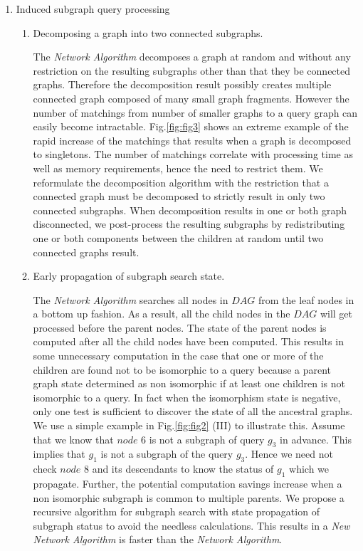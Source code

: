 \begin{enumerate}
\item Induced subgraph query processing

\begin{enumerate}
\item Decomposing a graph into two connected subgraphs.


The \textit{Network Algorithm} decomposes a graph at random and without any restriction on the resulting subgraphs other than that they be connected graphs.
Therefore the decomposition result possibly creates multiple connected graph composed of many small graph fragments.
However the number of matchings from number of smaller graphs to a query graph can easily become intractable.
Fig.\ref{fig:fig3} shows an extreme example of the rapid increase of the matchings that results when a graph is decomposed to singletons.
The number of matchings correlate with processing time as well as memory requirements, hence the need to restrict them. We reformulate the decomposition algorithm with the restriction that a connected graph must be decomposed to strictly result in only two connected subgraphs. When decomposition results in one or both graph disconnected, we post-process the resulting subgraphs by redistributing one or both components between the children  at random until two connected graphs result.


\item Early propagation of subgraph search state.

The \textit{Network Algorithm} searches all nodes in $DAG$ from the leaf nodes in a bottom up fashion.
As a result, all the child nodes in the $DAG$ will get processed before the parent nodes. The state of the parent nodes is computed after all the child nodes have been computed. This results in some unnecessary computation in the case that one or more of the children are found not to be isomorphic to a query because a parent graph state determined as non isomorphic if at least one children is not isomorphic to a query.  In fact when the isomorphism state is negative, only one test is sufficient to discover the state of all the ancestral graphs. We use a simple example in Fig.\ref{fig:fig2} (III) to illustrate this.
Assume that we know that $node$ 6 is not a subgraph of query $g_3$ in advance. This implies that $g_1$ is not a subgraph of the query $g_3$.
Hence we need not check $node$ 8 and its descendants to know the status of $g_1$ which we propagate. Further, the potential computation savings increase when a non isomorphic subgraph is common to multiple parents. We propose a recursive algorithm for subgraph search with state propagation of subgraph status to avoid the needless calculations. This results in a \textit{New Network Algorithm} is faster than the \textit{Network Algorithm}.
\end{enumerate}


\end{enumerate}
